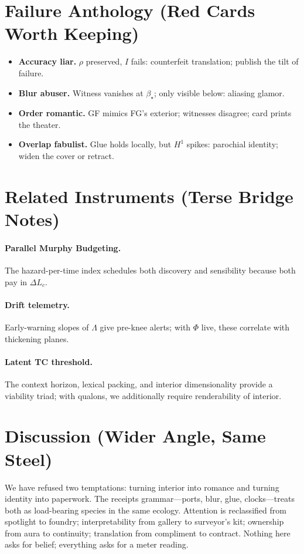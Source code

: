 \documentclass[11pt]{article}
\newcommand{\1}{\mathbf{1}}
\newcommand{\ratio}{\rho}
\newcommand{\rate}{I}
\newcommand{\Blur}{\beta}
\newcommand{\Lc}{L_c}
\newcommand{\PhiField}{\Phi}
\begin{document}
\section{Failure Anthology (Red Cards Worth Keeping)}
\begin{itemize}
\item \textbf{Accuracy liar.} $\ratio$ preserved, $\rate$ fails: counterfeit translation; publish the tilt of failure.
\item \textbf{Blur abuser.} Witness vanishes at $\Blur_\star$; only visible below: aliasing glamor.
\item \textbf{Order romantic.} GF mimics FG’s exterior; witnesses disagree; card prints the theater.
\item \textbf{Overlap fabulist.} Glue holds locally, but $H^1$ spikes: parochial identity; widen the cover or retract.
\end{itemize}

\section{Related Instruments (Terse Bridge Notes)}
\paragraph{Parallel Murphy Budgeting.} The hazard-per-time index schedules both discovery and sensibility because both pay in $\Delta\Lc$. 

\paragraph{Drift telemetry.} Early-warning slopes of $\Lambda$ give pre-knee alerts; with $\PhiField$ live, these correlate with thickening planes.

\paragraph{Latent TC threshold.} The context horizon, lexical packing, and interior dimensionality provide a viability triad; with qualons, we additionally require renderability of interior.

\section{Discussion (Wider Angle, Same Steel)}
We have refused two temptations: turning interior into romance and turning identity into paperwork. The receipts grammar—ports, blur, glue, clocks—treats both as load-bearing species in the same ecology. Attention is reclassified from spotlight to foundry; interpretability from gallery to surveyor’s kit; ownership from aura to continuity; translation from compliment to contract. Nothing here asks for belief; everything asks for a meter reading.
\end{document}
